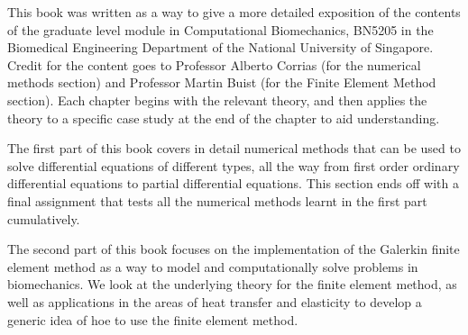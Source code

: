 This book was written as a way to give a more detailed exposition of the contents of the graduate level module in Computational Biomechanics, BN5205 in the Biomedical Engineering Department of the National University of Singapore. Credit for the content goes to Professor Alberto Corrias (for the numerical methods section) and Professor Martin Buist (for the Finite Element Method section). Each chapter begins with the relevant theory, and then applies the theory to a specific case study at the end of the chapter to aid understanding.

The first part of this book covers in detail numerical methods that can be used to solve differential equations of different types, all the way from first order ordinary differential equations to partial differential equations. This section ends off with a final assignment that tests all the numerical methods learnt in the first part cumulatively.

The second part of this book focuses on the implementation of the Galerkin finite element method as a way to model and computationally solve problems in biomechanics. We look at the underlying theory for the finite element method, as well as applications in the areas of heat transfer and elasticity to develop a generic idea of hoe to use the finite element method.

